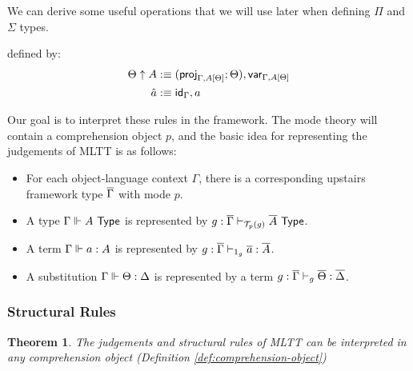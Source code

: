 \documentclass[10pt]{article}
\newtheorem{theorem}{Theorem}
\theoremstyle{definition}
\newcommand{\yields}{\vdash}
\newcommand{\TYPE}{\,\,\mathsf{Type}}
\newcommand{\id}{\mathsf{id}}
\newcommand\El[2]{\mathcal{T}_{#1}(#2)}
\begin{document}
We can derive some useful operations that we will use later when defining $\Pi$ and $\Sigma$ types.
defined by:
\begin{align*}
\Theta \uparrow A &:\equiv (\proj{\Gamma, A[\Theta]}; \Theta) , \var{\Gamma, A[\Theta]} \\
\hat{a} &:\equiv \id_{\Gamma} , a
\end{align*}

Our goal is to interpret these rules in the framework. The mode theory will contain a comprehension object $p$, and the basic idea for representing the judgements of MLTT is as follows:

\begin{itemize}
\item For each object-language context $\Gamma$, there is a corresponding upstairs framework type $\overline{\Gamma}$ with mode $p$.

\item A type $\Gamma \qyields A \TYPE$ is represented by $g : \upstairs{\Gamma} \yields_{\El{p}{g}} \upstairs{A} \TYPE$.
  
\item A term $\Gamma \Vdash a : A$ is represented by $g : \upstairs{\Gamma} \yields_{1_g} \upstairs{a} : \upstairs{A}$.

\item A substitution $\Gamma \Vdash \Theta : \Delta$ is represented by a term $g : \upstairs{\Gamma} \yields_g \upstairs{\Theta} : \upstairs{\Delta}$.
\end{itemize}

\subsubsection{Structural Rules}

\begin{theorem}
The judgements and structural rules of MLTT can be interpreted in any comprehension object (Definition \ref{def:comprehension-object})
\end{theorem}
\end{document}

